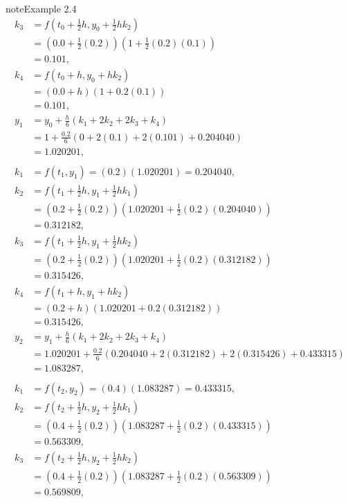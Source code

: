 \documentclass[letterpaper,10pt,english]{jupyterBook}
\begin{document}
\begin{sphinxadmonition}{note}{Example 2.4}
\begin{align*}
    k_3 &= f(t_0 + \frac{1}{2}h, y_0 + \frac{1}{2}hk_2) \\
    &= (0.0 + \frac{1}{2}(0.2))(1 + \frac{1}{2}(0.2)(0.1)) \\
    &= 0.101, \\
    k_4 &= f(t_0 + h, y_0 + hk_2) \\
    &= (0.0 + h)(1 + 0.2(0.1)) \\
    &= 0.101, \\
    y_1 &= y_0 + \frac{h}{6}(k_1 + 2k_2 + 2k_3 + k_4) \\
    &= 1 + \frac{0.2}{6}(0 + 2(0.1) + 2(0.101) + 0.204040) \\
    &= 1.020201, \\
    \\
    k_1 &= f(t_1, y_1) = (0.2)(1.020201) = 0.204040, \\
    k_2 &= f(t_1 + \frac{1}{2}h, y_1 + \frac{1}{2}hk_1) \\
    &= (0.2 + \frac{1}{2}(0.2))(1.020201 + \frac{1}{2}(0.2)(0.204040)) \\
    &= 0.312182, \\
    k_3 &= f(t_1 + \frac{1}{2}h, y_1 + \frac{1}{2}hk_2) \\
    &= (0.2 + \frac{1}{2}(0.2))(1.020201 + \frac{1}{2}(0.2)(0.312182)) \\
    &= 0.315426, \\
    k_4 &= f(t_1 + h, y_1 + hk_2) \\
    &= (0.2 + h)(1.020201 + 0.2(0.312182)) \\
    &= 0.315426, \\
    y_2 &= y_1 + \frac{h}{6}(k_1 + 2k_2 + 2k_3 + k_4) \\
    &= 1.020201 + \frac{0.2}{6}(0.204040 + 2(0.312182) + 2(0.315426) + 0.433315) \\
    &= 1.083287, \\
    \\
    k_1 &= f(t_2, y_2) = (0.4)(1.083287) = 0.433315, \\
    k_2 &= f(t_2 + \frac{1}{2}h, y_2 + \frac{1}{2}hk_1) \\
    &= (0.4 + \frac{1}{2}(0.2))(1.083287 + \frac{1}{2}(0.2)(0.433315)) \\
    &= 0.563309, \\
    k_3 &= f(t_2 + \frac{1}{2}h, y_2 + \frac{1}{2}hk_2) \\
    &= (0.4 + \frac{1}{2}(0.2))(1.083287 + \frac{1}{2}(0.2)(0.563309)) \\
    &= 0.569809, \\

\end{align*}
\end{sphinxadmonition}
\end{document}
